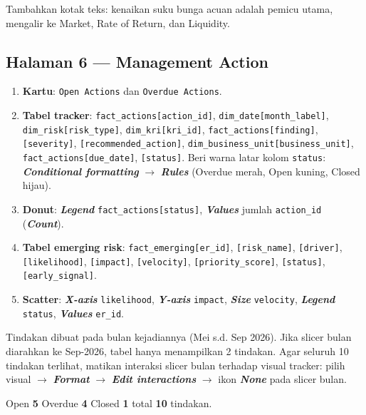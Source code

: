 \documentclass[11pt,a4paper]{article}
\newcommand{\file}[1]{\texttt{\small #1}}
\newcommand{\ui}[1]{\textbf{\textit{#1}}}
\begin{document}
Tambahkan kotak teks: kenaikan suku bunga acuan adalah pemicu utama, mengalir ke Market, Rate of Return, dan Liquidity.

\subsection{Halaman 6 --- Management Action}

\begin{enumerate}
\item \textbf{Kartu}: \file{Open Actions} dan \file{Overdue Actions}.
\item \textbf{Tabel tracker}: \file{fact\_actions[action\_id]}, \file{dim\_date[month\_label]}, \file{dim\_risk[risk\_type]}, \file{dim\_kri[kri\_id]}, \file{fact\_actions[finding]}, \file{[severity]}, \file{[recommended\_action]}, \file{dim\_business\_unit[business\_unit]}, \file{fact\_actions[due\_date]}, \file{[status]}. Beri warna latar kolom \file{status}: \ui{Conditional formatting} $\rightarrow$ \ui{Rules} (Overdue merah, Open kuning, Closed hijau).
\item \textbf{Donut}: \ui{Legend} \file{fact\_actions[status]}, \ui{Values} jumlah \file{action\_id} (\ui{Count}).
\item \textbf{Tabel emerging risk}: \file{fact\_emerging[er\_id]}, \file{[risk\_name]}, \file{[driver]}, \file{[likelihood]}, \file{[impact]}, \file{[velocity]}, \file{[priority\_score]}, \file{[status]}, \file{[early\_signal]}.
\item \textbf{Scatter}: \ui{X-axis} \file{likelihood}, \ui{Y-axis} \file{impact}, \ui{Size} \file{velocity}, \ui{Legend} \file{status}, \ui{Values} \file{er\_id}.
\end{enumerate}

\begin{warnbox}
Tindakan dibuat pada bulan kejadiannya (Mei s.d. Sep 2026). Jika slicer bulan diarahkan ke Sep-2026, tabel hanya menampilkan 2 tindakan. Agar seluruh 10 tindakan terlihat, matikan interaksi slicer bulan terhadap visual tracker: pilih visual $\rightarrow$ \ui{Format} $\rightarrow$ \ui{Edit interactions} $\rightarrow$ ikon \ui{None} pada slicer bulan.
\end{warnbox}

\begin{tipbox}
Open \textbf{5} \textbullet{} Overdue \textbf{4} \textbullet{} Closed \textbf{1} \textbullet{} total \textbf{10} tindakan.
\end{tipbox}
\end{document}
